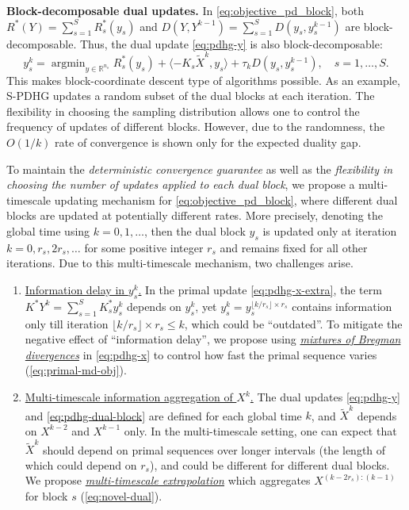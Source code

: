 \documentclass[10pt]{article}
\newcommand{\R}{\mathbb{R}}
\DeclareMathOperator*{\argmin}{argmin}
\begin{document}
\textbf{Block-decomposable dual updates.} In \eqref{eq:objective_pd_block}, both $R^*(Y) = \sum_{s=1}^S R^*_s(y_s)$ and $D(Y,Y^{k-1}) = \sum_{s=1}^S D(y_s,y_s^{k-1})$ are block-decomposable. Thus, the dual update \eqref{eq:pdhg-y} is also block-decomposable: 
\begin{equation}\label{eq:pdhg-dual-block}
    y_s^{k} =\argmin_{y\in \R^{n_s}} R_s^*(y_s)+ \langle -K_s\widetilde{X}^{k},y_s\rangle + \tau_k D(y_s,y_s^{k-1}),\quad s=1,\ldots,S.
\end{equation}
This makes block-coordinate descent type of algorithms possible. As an example, S-PDHG \cite{Chambolle2018Stochastic} updates a random subset of the dual blocks at each iteration. The flexibility in choosing the sampling distribution allows one to control the frequency of updates of different blocks. However, due to the randomness, the $O(1/k)$ rate of convergence is shown only for the expected duality gap. 

To maintain the \textit{deterministic convergence guarantee} as well as the \textit{flexibility in choosing the number of updates applied to each dual block}, we propose a multi-timescale updating mechanism for \eqref{eq:objective_pd_block}, where different dual blocks are updated at potentially different rates. More precisely, denoting the global time using $k=0,1,\ldots$, then the dual block $y_s$ is updated only at iteration $k=0,r_s,2r_s,\ldots$ for some positive integer $r_s$ and remains fixed for all other iterations. Due to this multi-timescale mechanism, two challenges arise. 
\begin{enumerate}
    \item \underline{Information delay in $y_s^k$.} In the primal update \eqref{eq:pdhg-x-extra}, the term $K^*Y^k = \sum_{s=1}^S K^*_sy_s^k$ depends on $y_s^k$, yet $y_s^{k} = y_s^{\lfloor k/r_s\rfloor\times r_s}$ contains information only till iteration $\lfloor k/r_s\rfloor\times r_s\leq k$, which could be ``outdated''. To mitigate the negative effect of ``information delay'', we propose using \underline{\textit{mixtures of Bregman divergences}} in \eqref{eq:pdhg-x} to control how fast the primal sequence varies (\eqref{eq:primal-md-obj}). 
    \item \underline{Multi-timescale information aggregation of $X^k$.} The dual updates \eqref{eq:pdhg-y} and \eqref{eq:pdhg-dual-block} are defined for each global time $k$, and $\widetilde{X}^k$ depends on $X^{k-2}$ and $X^{k-1}$ only. In the multi-timescale setting, one can expect that $\widetilde{X}^k$ should depend on primal sequences over longer intervals (the length of which could depend on $r_s$), and could be different for different dual blocks. We propose \underline{\textit{multi-timescale extrapolation}} which aggregates $X^{(k-2r_s):(k-1)}$ for block $s$ (\eqref{eq:novel-dual}).  
\end{enumerate}
\end{document}
